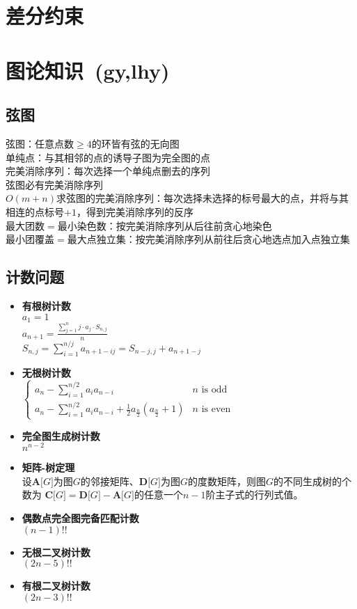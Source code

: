 \section{差分约束}
\section{图论知识\ \small(gy,lhy)}
	\subsection*{弦图}
		弦图：任意点数$ \geq 4 $的环皆有弦的无向图
		\\单纯点：与其相邻的点的诱导子图为完全图的点
		\\完美消除序列：每次选择一个单纯点删去的序列
		\\弦图必有完美消除序列
		\\$ O(m + n) $求弦图的完美消除序列：每次选择未选择的标号最大的点，并将与其相连的点标号$ + 1 $，得到完美消除序列的反序
		\\最大团数$ = $最小染色数：按完美消除序列从后往前贪心地染色
		\\最小团覆盖$ = $最大点独立集：按完美消除序列从前往后贪心地选点加入点独立集
	\subsection*{计数问题}
		\begin{itemize}
			\item \textbf{有根树计数}
			\\$ a_1 = 1 $
			\\$ a_{n + 1} = \frac{\sum\limits_{j = 1}^{n} j \cdot a_j \cdot S_{n, j}}{n} $
			\\$ S_{n, j} = \sum\limits_{i = 1}^{n / j} a_{n + 1 - ij} = S_{n - j, j} + a_{n + 1 - j} $
			\item \textbf{无根树计数}
			\\$ \begin{cases}
				a_n - \sum\limits_{i = 1}^{n / 2} a_i a_{n - i} & n \text{ is odd}\\
				a_n - \sum\limits_{i = 1}^{n / 2} a_i a_{n - i} + \frac{1}{2} a_{\frac{n}{2}} (a_{\frac{n}{2}} + 1) & n \text{ is even}
			\end{cases} $
			\item \textbf{完全图生成树计数}
			\\$ n^{n - 2} $
			\item \textbf{矩阵-树定理}
			\\设$ \mathbf{A}\lbrack G \rbrack $为图$ G $的邻接矩阵、$ \mathbf{D}\lbrack G \rbrack $为图$ G $的度数矩阵，则图$ G $的不同生成树的个数为 $ \mathbf{C}\lbrack G \rbrack = \mathbf{D}\lbrack G \rbrack - \mathbf{A}\lbrack G \rbrack $的任意一个$ n - 1 $阶主子式的行列式值。
			\item \textbf{偶数点完全图完备匹配计数}
			\\$ (n - 1)!! $
			\item \textbf{无根二叉树计数}
			\\$ (2n - 5)!! $
			\item \textbf{有根二叉树计数}
			\\$ (2n - 3)!! $
		\end{itemize}
